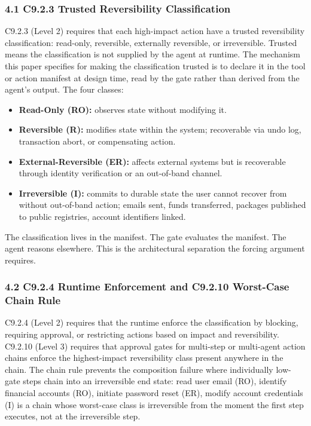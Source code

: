 \documentclass[
  11pt,
]{article}
\providecommand{\tightlist}{%
  \setlength{\itemsep}{0pt}\setlength{\parskip}{0pt}}
\begin{document}
\subsubsection{4.1 C9.2.3 Trusted Reversibility
Classification}\label{c9.2.3-trusted-reversibility-classification}

C9.2.3 (Level 2) requires that each high-impact action have a trusted
reversibility classification: read-only, reversible, externally
reversible, or irreversible. Trusted means the classification is not
supplied by the agent at runtime. The mechanism this paper specifies for
making the classification trusted is to declare it in the tool or action
manifest at design time, read by the gate rather than derived from the
agent's output. The four classes:

\begin{itemize}
\tightlist
\item
  \textbf{Read-Only (RO):} observes state without modifying it.
\item
  \textbf{Reversible (R):} modifies state within the system; recoverable
  via undo log, transaction abort, or compensating action.
\item
  \textbf{External-Reversible (ER):} affects external systems but is
  recoverable through identity verification or an out-of-band channel.
\item
  \textbf{Irreversible (I):} commits to durable state the user cannot
  recover from without out-of-band action; emails sent, funds
  transferred, packages published to public registries, account
  identifiers linked.
\end{itemize}

The classification lives in the manifest. The gate evaluates the
manifest. The agent reasons elsewhere. This is the architectural
separation the forcing argument requires.

\subsubsection{4.2 C9.2.4 Runtime Enforcement and C9.2.10 Worst-Case
Chain
Rule}\label{c9.2.4-runtime-enforcement-and-c9.2.10-worst-case-chain-rule}

C9.2.4 (Level 2) requires that the runtime enforce the classification by
blocking, requiring approval, or restricting actions based on impact and
reversibility. C9.2.10 (Level 3) requires that approval gates for
multi-step or multi-agent action chains enforce the highest-impact
reversibility class present anywhere in the chain. The chain rule
prevents the composition failure where individually low-gate steps chain
into an irreversible end state: read user email (RO), identify financial
accounts (RO), initiate password reset (ER), modify account credentials
(I) is a chain whose worst-case class is irreversible from the moment
the first step executes, not at the irreversible step.
\end{document}
